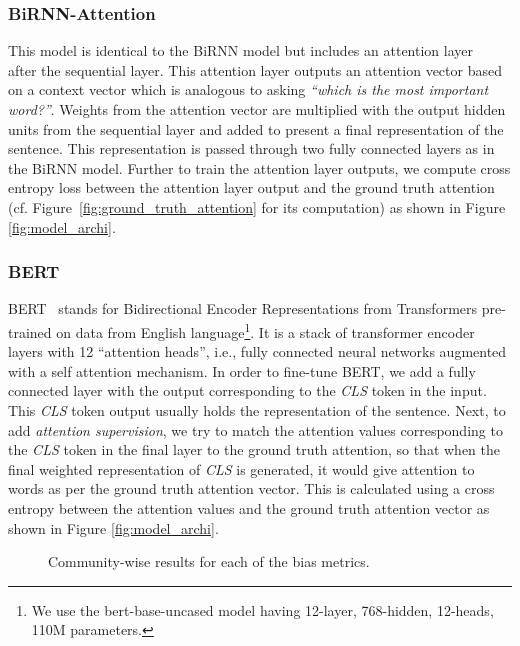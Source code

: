 \documentclass[letterpaper]{article} \usepackage{aaai21}  \usepackage{times}  \usepackage{helvet} \usepackage{courier}  \usepackage[hyphens]{url}  \usepackage{graphicx} \urlstyle{rm} \def\UrlFont{\rm}  \usepackage{natbib}  \usepackage{caption}
\begin{document}
\subsubsection{BiRNN-Attention} 
This model is identical to the BiRNN model but includes an attention layer~\cite{liu2016attention} after the sequential layer. This attention layer outputs an attention vector based on a context vector which is analogous to asking \textit{``which is the most important word?''}. Weights from the attention vector are multiplied with the output hidden units from the sequential layer and added to present a final representation of the sentence. This representation is passed through two fully connected layers as in the BiRNN model. Further to train the attention layer outputs, 
we compute cross entropy loss between the attention layer output and the ground truth attention (cf. Figure~\ref{fig:ground_truth_attention} for its computation) as shown in Figure \ref{fig:model_archi}. 




\subsubsection{BERT} BERT~\cite{devlin2019bert} stands for Bidirectional Encoder Representations from Transformers pre-trained on data from English language\footnote{We use the bert-base-uncased model having 12-layer, 768-hidden, 12-heads, 110M parameters.}. It is a stack of transformer encoder layers with 12 ``attention heads'', i.e., fully connected neural networks augmented with a self attention mechanism. In order to fine-tune BERT, we add a fully connected layer with the output corresponding to the \textit{CLS} token in the input. 
This \textit{CLS} token output usually holds the representation of the sentence. Next, to add \textit{attention supervision}, we try to match the attention values corresponding to the \textit{CLS} token in the final layer to the ground truth attention, so that when the final weighted representation of \textit{CLS} is generated, it would give attention to words as per the ground truth attention vector. This is calculated using a cross entropy between the attention values and the ground truth attention vector as shown in Figure \ref{fig:model_archi}.







\begin{figure*}[!tbh]\centering
    \caption{Community-wise results for each of the bias metrics.}\label{fig:bias_community_wise}\end{figure*}
\end{document}
